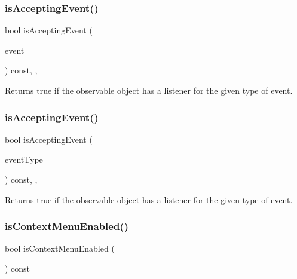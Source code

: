 \subsubsection{\texorpdfstring{is\+Accepting\+Event()}{isAcceptingEvent()}\hspace{0.1cm}{\footnotesize\ttfamily [2/3]}}
{\footnotesize\ttfamily bool is\+Accepting\+Event (\begin{DoxyParamCaption}\item[{const \mbox{\hyperlink{classsgl_1_1GEvent}{G\+Event}} \&}]{event }\end{DoxyParamCaption}) const\hspace{0.3cm}{\ttfamily [protected]}, {\ttfamily [virtual]}, {\ttfamily [inherited]}}



Returns true if the observable object has a listener for the given type of event. 

\mbox{\label{classsgl_1_1GObservable_a3b1c689267eda44e65a2213e7de38b23}} 
\subsubsection{\texorpdfstring{is\+Accepting\+Event()}{isAcceptingEvent()}\hspace{0.1cm}{\footnotesize\ttfamily [3/3]}}
{\footnotesize\ttfamily bool is\+Accepting\+Event (\begin{DoxyParamCaption}\item[{const std\+::string \&}]{event\+Type }\end{DoxyParamCaption}) const\hspace{0.3cm}{\ttfamily [protected]}, {\ttfamily [virtual]}, {\ttfamily [inherited]}}



Returns true if the observable object has a listener for the given type of event. 

\mbox{\label{classsgl_1_1GTextArea_a80f9fe3b6f725182b294886f57cc1689}} 
\subsubsection{\texorpdfstring{is\+Context\+Menu\+Enabled()}{isContextMenuEnabled()}}
{\footnotesize\ttfamily bool is\+Context\+Menu\+Enabled (\begin{DoxyParamCaption}{ }\end{DoxyParamCaption}) const\hspace{0.3cm}{\ttfamily [virtual]}}



